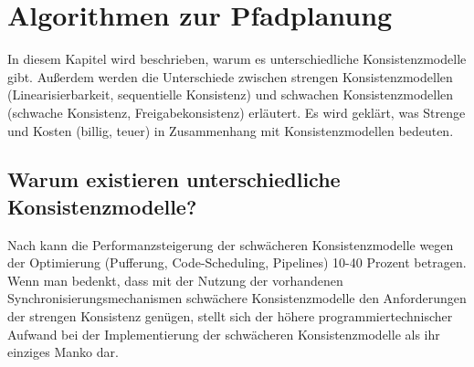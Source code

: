 \chapter{Algorithmen zur Pfadplanung}

In diesem Kapitel wird beschrieben, warum es unterschiedliche Konsistenzmodelle gibt. Außerdem werden die Unterschiede zwischen strengen Konsistenzmodellen (Linearisierbarkeit, sequentielle Konsistenz) und schwachen Konsistenzmodellen (schwache Konsistenz, Freigabekonsistenz) erläutert. Es wird geklärt, was Strenge und Kosten (billig, teuer) in Zusammenhang mit Konsistenzmodellen bedeuten.

\section{Warum existieren unterschiedliche Konsistenzmodelle?}


Nach \cite{Mosberger:93} kann die Performanzsteigerung der schwächeren Konsistenzmodelle wegen der Optimierung (Pufferung, Code-Scheduling, Pipelines) 10-40 Prozent betragen. Wenn man bedenkt, dass mit der Nutzung der vorhandenen Synchronisierungsmechanismen schwächere Konsistenzmodelle den Anforderungen der strengen Konsistenz genügen, stellt sich der höhere programmiertechnischer Aufwand bei der Implementierung der schwächeren Konsistenzmodelle als ihr einziges Manko dar.
